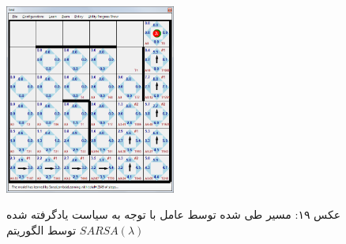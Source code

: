 \documentclass[10pt,a4paper]{article}
\begin{document}
\begin{figure}[H]
    \centering
    \includegraphics[width=0.5\textwidth]{rlambda-exec}
    \begin{center}
    \textarabic{عکس ۱۹: مسیر طی شده توسط عامل با توجه به سیاست یادگرفته شده توسط الگوریتم $SARSA(\lambda)$ }
    \end{center}
\end{figure}
\end{document}
